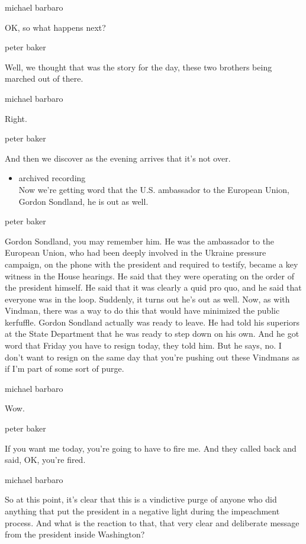 michael barbaro

OK, so what happens next?

peter baker

Well, we thought that was the story for the day, these two brothers
being marched out of there.

michael barbaro

Right.

peter baker

And then we discover as the evening arrives that it's not over.

\begin{itemize}
\tightlist
\item
  archived recording\\
  Now we're getting word that the U.S. ambassador to the European Union,
  Gordon Sondland, he is out as well.
\end{itemize}

peter baker

Gordon Sondland, you may remember him. He was the ambassador to the
European Union, who had been deeply involved in the Ukraine pressure
campaign, on the phone with the president and required to testify,
became a key witness in the House hearings. He said that they were
operating on the order of the president himself. He said that it was
clearly a quid pro quo, and he said that everyone was in the loop.
Suddenly, it turns out he's out as well. Now, as with Vindman, there was
a way to do this that would have minimized the public kerfuffle. Gordon
Sondland actually was ready to leave. He had told his superiors at the
State Department that he was ready to step down on his own. And he got
word that Friday you have to resign today, they told him. But he says,
no. I don't want to resign on the same day that you're pushing out these
Vindmans as if I'm part of some sort of purge.

michael barbaro

Wow.

peter baker

If you want me today, you're going to have to fire me. And they called
back and said, OK, you're fired.

michael barbaro

So at this point, it's clear that this is a vindictive purge of anyone
who did anything that put the president in a negative light during the
impeachment process. And what is the reaction to that, that very clear
and deliberate message from the president inside Washington?

